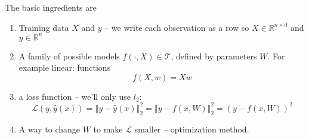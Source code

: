 The basic ingredients are
\begin{enumerate}
	\item Training data $X$ and $y$ -- we write each observation as a row so $X \in \mathbb{R}^{n\times d}$ and $y\in \mathbb{R}^{n}$
	\item A family of possible models $f(\cdot,X)\in \mathcal{T}$, defined by parameters $W$. For example linear: functions \[
	f(X,w)=Xw\]
	\item a loss function -- we'll only use $l_{2}$:
	\[
	\mathcal{L}(y,\hat{y}(x)) = \left\Vert y - \hat{y}(x)\right\Vert_2^2 = \left\Vert y - f(x,W)\right\Vert_2^2 = \left(y - f(x,W)\right)^2
	\]
	\item A way to change $W$ to make $\mathcal{L}$ smaller -- optimization method.
\end{enumerate}
